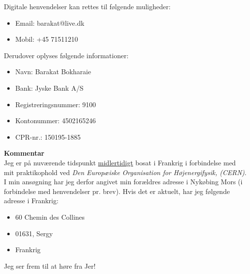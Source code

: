 \documentclass[../Ansoegning.tex]{subfiles}
\begin{document}
Digitale henvendelser kan rettes til følgende muligheder:
\begin{itemize}
    \item[] Email: barakat@live.dk
    \item[] Mobil: +45 71511210
\end{itemize}

Derudover oplyses følgende informationer:
    \begin{itemize}
        \item Navn: Barakat Bokharaie
        \item Bank: Jyske Bank A/S
        \item Registreringsnummer: 9100
        \item Kontonummer: 4502165246
        \item CPR-nr.: 150195-1885
    \end{itemize}
    
\textbf{Kommentar}  \\
Jeg er på nuværende tidspunkt \underline{midlertidigt} bosat i Frankrig i forbindelse med mit praktikophold ved \textit{Den Europæiske Organisation for Højenergifysik, (CERN)}.  I min ansøgning har jeg derfor angivet min forældres adresse i Nykøbing Mors (i forbindelse med henvendelser pr. brev). Hvis det er aktuelt, har jeg følgende adresse i Frankrig:

\begin{itemize}
    \item[] 60 Chemin des Collines
    \item[] 01631, Sergy
    \item[] Frankrig
\end{itemize}

Jeg ser frem til at høre fra Jer!
\end{document}

